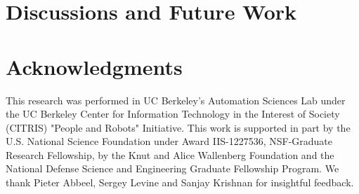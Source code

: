 \documentclass[10pt, conference]{ieeeconf}      %
\begin{document}
 
\section{Discussions and Future Work}

 \section{Acknowledgments} 
This research was performed in UC Berkeley's Automation Sciences Lab under the UC Berkeley Center for Information Technology in the Interest of Society (CITRIS) "People and Robots" Initiative. This work is supported in part by the U.S. National Science Foundation under Award IIS-1227536, NSF-Graduate Research Fellowship, by the Knut and Alice Wallenberg Foundation and the National Defense Science and Engineering Graduate Fellowship Program. We thank Pieter Abbeel, Sergey Levine and Sanjay Krishnan for insightful feedback. 

  


\end{document}
